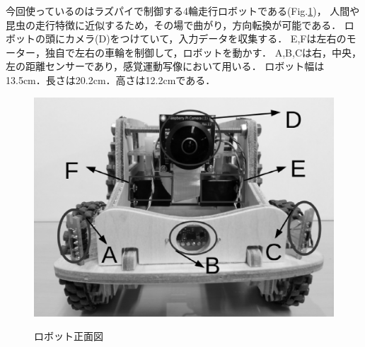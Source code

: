 今回使っているのはラズパイで制御する4輪走行ロボットである(Fig.\ref{robot_img})，
人間や昆虫の走行特徴に近似するため，その場で曲がり，方向転換が可能である．
ロボットの頭にカメラ(D)をつけていて，入力データを収集する．
E,Fは左右のモーター，独自で左右の車輪を制御して，ロボットを動かす．
A,B,Cは右，中央，左の距離センサーであり，感覚運動写像において用いる\cite{li2020}．
ロボット幅は13.5cm．長さは20.2cm．高さは12.2cmである．

\vspace{-4mm}
\begin{figure}[htb]
    \centering
    \includegraphics[width=0.4\linewidth]{robot1.eps}
　　\label{robot_img}
    \caption{ロボット正面図}
\end{figure}




